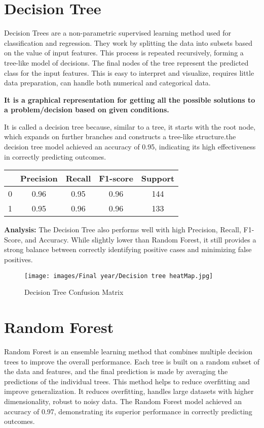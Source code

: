 \documentclass{report}
\begin{document}
{\section{Decision Tree}
Decision Trees are a non-parametric supervised learning method used for classification and regression. They work by splitting the data into subsets based on the value of input features. This process is repeated recursively, forming a tree-like model of decisions. The final nodes of the tree represent the predicted class for the input features. This is easy to interpret and visualize, requires little data preparation, can handle both numerical and categorical data.

\textbf{It is a graphical representation for getting all the possible solutions to a problem/decision based on given conditions.}

It is called a decision tree because, similar to a tree, it starts with the root node, which expands on further branches and constructs a tree-like structure.the decision tree model achieved an accuracy of 0.95, indicating its high effectiveness in correctly predicting outcomes.\\
\begin{center}
\begin{tabular}{|c|c|c|c|c|}
  \hline
   & Precision & Recall & F1-score & Support \\
  \hline
  0 & 0.96 & 0.95 & 0.96 & 144 \\
  1 & 0.95 & 0.96 & 0.96 & 133 \\
  \hline
\end{tabular}
\end{center}
\textbf{Analysis: } The Decision Tree also performs well with high Precision, Recall, F1-Score, and Accuracy. While slightly lower than Random Forest, it still provides a strong balance between correctly identifying positive cases and minimizing false positives.
\vspace{1cm}
    \begin{figure}[h!]
    \centering
        \texttt{[image: images/Final year/Decision tree heatMap.jpg]} %
        \caption{Decision Tree Confusion Matrix}
    \end{figure}
\section{Random Forest}
Random Forest is an ensemble learning method that combines multiple decision trees to improve the overall performance. Each tree is built on a random subset of the data and features, and the final prediction is made by averaging the predictions of the individual trees. This method helps to reduce overfitting and improve generalization. It reduces overfitting, handles large datasets with higher dimensionality, robust to noisy data.
The Random Forest model achieved an accuracy of 0.97, demonstrating its superior performance in correctly predicting outcomes.

}
\end{document}
